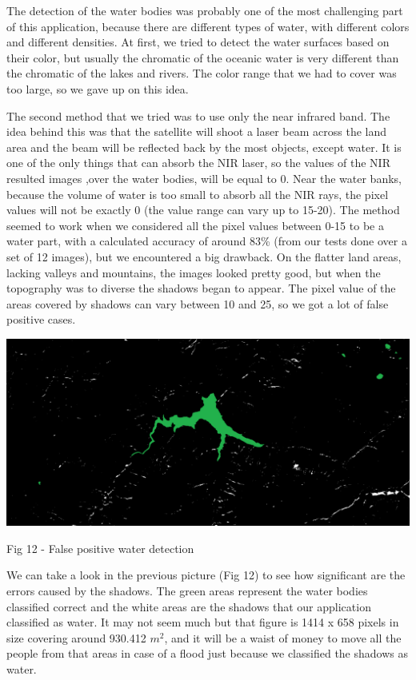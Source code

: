 \documentclass[12pt, a4paper]{report}
\begin{document}
The detection of the water bodies was probably one of the most challenging part of this application, because there are different types of water, with different colors and different densities. At first, we tried to detect the water surfaces based on their color, but usually the chromatic of the oceanic water is very different than the chromatic of the lakes and rivers. The color range that we had to cover was too large, so we gave up on this idea. 
\par 
The second method that we tried was to use only the near infrared band. The idea behind this was that the satellite will shoot a laser beam across the land area and the beam will be reflected back by the most objects, except water. It is one of the only things that can absorb the NIR laser, so the values of the NIR resulted images ,over the water bodies, will be equal to 0. Near the water banks, because the volume of water is too small to absorb all the NIR rays, the pixel values will not be exactly 0 (the value range can vary up to 15-20). The method seemed to work when we considered all the pixel values between 0-15 to be a water part, with a calculated accuracy of around 83\% (from our tests done over a set of 12 images), but we encountered a big drawback. On the flatter land areas, lacking valleys and mountains, the images looked pretty good, but when the topography was to diverse the shadows began to appear. The pixel value of the areas covered by shadows can vary between 10 and 25, so we got a lot of false positive cases.

\bigskip
\includegraphics[scale=0.4, left]{water-false-positive.png}
\begin{center}
Fig 12 - False positive water detection
\end{center}
\par 

We can take a look in the previous picture (Fig 12) to see how significant are the errors caused by the shadows. The green areas represent the water bodies classified correct and the white areas are the shadows that our application classified as water. It may not seem much but that figure is 1414 x 658 pixels in size covering around 930.412 $m^2$, and it will be a waist of money to move all the people from that areas in case of a flood just because we classified the shadows as water.
\par 
\end{document}

